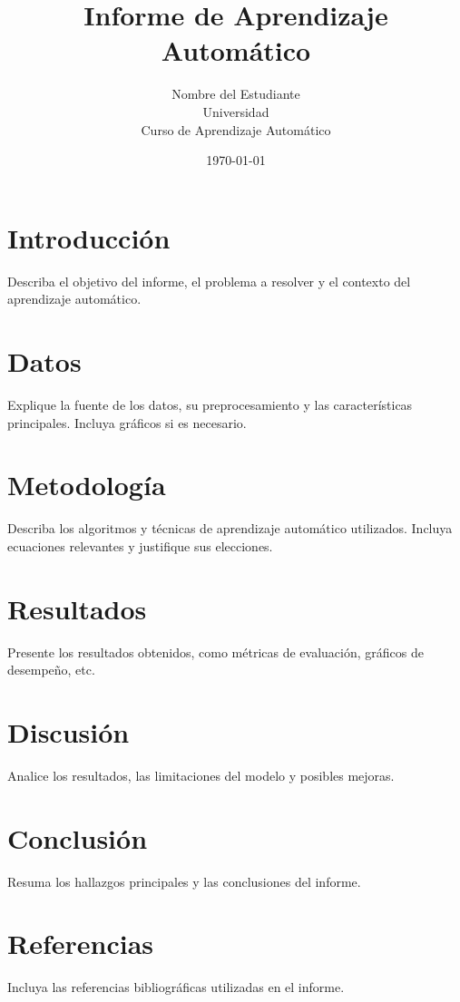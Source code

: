 \documentclass[12pt,a4paper]{article}
\title{Informe de Aprendizaje Automático}
\author{Nombre del Estudiante \\ Universidad \\ Curso de Aprendizaje Automático}
\date{\today}
\begin{document}
\maketitle
\tableofcontents
\newpage

\section{Introducción}
Describa el objetivo del informe, el problema a resolver y el contexto del aprendizaje automático.

\section{Datos}
Explique la fuente de los datos, su preprocesamiento y las características principales. Incluya gráficos si es necesario.

\section{Metodología}
Describa los algoritmos y técnicas de aprendizaje automático utilizados. Incluya ecuaciones relevantes y justifique sus elecciones.

\section{Resultados}
Presente los resultados obtenidos, como métricas de evaluación, gráficos de desempeño, etc.

\section{Discusión}
Analice los resultados, las limitaciones del modelo y posibles mejoras.

\section{Conclusión}
Resuma los hallazgos principales y las conclusiones del informe.

\section*{Referencias}
Incluya las referencias bibliográficas utilizadas en el informe.
\end{document}
